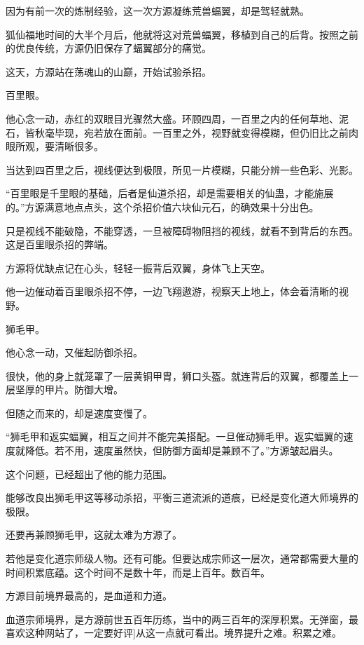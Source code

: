 
\begin{this_body}



因为有前一次的炼制经验，这一次方源凝练荒兽蝠翼，却是驾轻就熟。

狐仙福地时间的大半个月后，他就将这对荒兽蝠翼，移植到自己的后背。按照之前的优良传统，方源仍旧保存了蝠翼部分的痛觉。

这天，方源站在荡魂山的山巅，开始试验杀招。

百里眼。

他心念一动，赤红的双眼目光骤然大盛。环顾四周，一百里之内的任何草地、泥石，皆秋毫毕现，宛若放在面前。一百里之外，视野就变得模糊，但仍旧比之前肉眼所观，要清晰很多。

当达到四百里之后，视线便达到极限，所见一片模糊，只能分辨一些色彩、光影。

“百里眼是千里眼的基础，后者是仙道杀招，却是需要相关的仙蛊，才能施展的。”方源满意地点点头，这个杀招价值六块仙元石，的确效果十分出色。

只是视线不能破隐，不能穿透，一旦被障碍物阻挡的视线，就看不到背后的东西。这是百里眼杀招的弊端。

方源将优缺点记在心头，轻轻一振背后双翼，身体飞上天空。

他一边催动着百里眼杀招不停，一边飞翔遨游，视察天上地上，体会着清晰的视野。

狮毛甲。

他心念一动，又催起防御杀招。

很快，他的身上就笼罩了一层黄铜甲胄，狮口头盔。就连背后的双翼，都覆盖上一层坚厚的甲片。防御大增。

但随之而来的，却是速度变慢了。

“狮毛甲和返实蝠翼，相互之间并不能完美搭配。一旦催动狮毛甲。返实蝠翼的速度就降低。若不用，速度虽然快，但防御方面却是兼顾不了。”方源皱起眉头。

这个问题，已经超出了他的能力范围。

能够改良出狮毛甲这等移动杀招，平衡三道流派的道痕，已经是变化道大师境界的极限。

还要再兼顾狮毛甲，这就太难为方源了。

若他是变化道宗师级人物。还有可能。但要达成宗师这一层次，通常都需要大量的时间积累底蕴。这个时间不是数十年，而是上百年。数百年。

方源目前境界最高的，是血道和力道。

血道宗师境界，是方源前世五百年历练，当中的两三百年的深厚积累。无弹窗，最喜欢这种网站了，一定要好评]从这一点就可看出。境界提升之难。积累之难。


\end{this_body}
